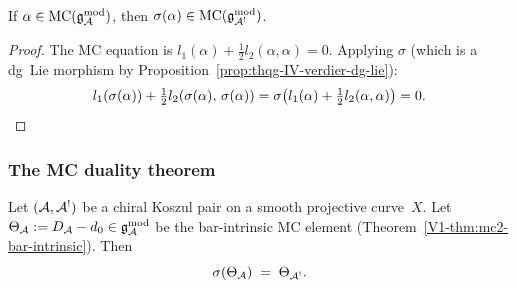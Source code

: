 \begin{corollary}
If $\alpha \in \mathrm{MC}(\mathfrak{g}_{\mathcal{A}}^{\mathrm{mod}})$, then
$\sigma(\alpha) \in
\mathrm{MC}(\mathfrak{g}_{\mathcal{A}^!}^{\mathrm{mod}})$.
\end{corollary}

\begin{proof}
The MC equation is $l_1(\alpha) + \tfrac{1}{2} l_2(\alpha, \alpha) = 0$.
Applying $\sigma$
(which is a dg~Lie morphism by
Proposition~\ref{prop:thqg-IV-verdier-dg-lie}):
\[
l_1(\sigma(\alpha))
+ \tfrac{1}{2} l_2(\sigma(\alpha),\,
\sigma(\alpha))
= \sigma
\bigl(l_1(\alpha) + \tfrac{1}{2} l_2(\alpha, \alpha)\bigr)
= 0.
\qedhere
\]
\end{proof}

\subsubsection{The MC duality theorem}

\begin{theorem}
\label{thm:thqg-IV-theta-duality}
Let $(\mathcal{A}, \mathcal{A}^!)$ be a chiral Koszul pair on a smooth projective
curve~$X$. Let
$\Theta_{\mathcal{A}} := D_{\mathcal{A}} - d_0 \in \mathfrak{g}_{\mathcal{A}}^{\mathrm{mod}}$
be the bar-intrinsic MC element
\textup{(}Theorem~\textup{\ref*{V1-thm:mc2-bar-intrinsic})}. Then
\begin{equation}%
\sigma(\Theta_\cA) \;=\; \Theta_{\cA^!}.
\end{equation}
\end{theorem}

